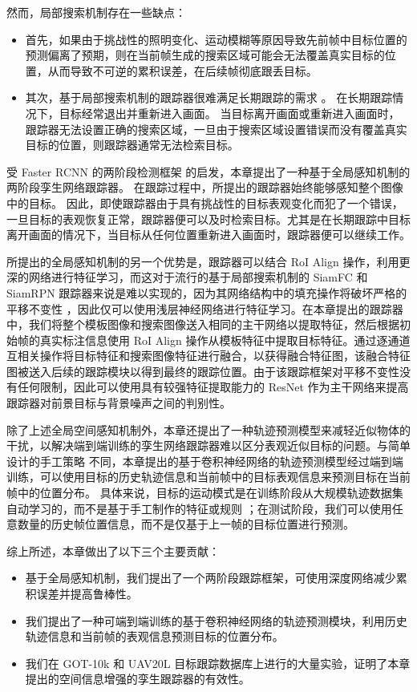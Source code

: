 然而，局部搜索机制存在一些缺点：

\begin{itemize}
\item 首先，如果由于挑战性的照明变化、运动模糊等原因导致先前帧中目标位置的预测偏离了预期，则在当前帧生成的搜索区域可能会无法覆盖真实目标的位置，从而导致不可逆的累积误差，在后续帧彻底跟丢目标。
\item 其次，基于局部搜索机制的跟踪器很难满足长期跟踪的需求 \cite{kalal2011tracking, hong2015multi}。
在长期跟踪情况下，目标经常退出并重新进入画面。
当目标离开画面或重新进入画面时，跟踪器无法设置正确的搜索区域，一旦由于搜索区域设置错误而没有覆盖真实目标的位置，则跟踪器通常无法检索目标。
\end{itemize}

受 Faster RCNN 的两阶段检测框架 \cite{ren2015faster} 的启发，本章提出了一种基于全局感知机制的两阶段孪生网络跟踪器。
在跟踪过程中，所提出的跟踪器始终能够感知整个图像中的目标。
因此，即使跟踪器由于具有挑战性的目标表观变化而犯了一个错误，一旦目标的表观恢复正常，跟踪器便可以及时检索目标。尤其是在长期跟踪中目标离开画面的情况下，当目标从任何位置重新进入画面时，跟踪器便可以继续工作。

所提出的全局感知机制的另一个优势是，跟踪器可以结合 RoI Align \cite{he2017mask} 操作，利用更深的网络进行特征学习，而这对于流行的基于局部搜索机制的 SiamFC \cite{SiamFC} 和 SiamRPN \cite{SiamRPN} 跟踪器来说是难以实现的，因为其网络结构中的填充操作将破坏严格的平移不变性 \cite{SiamRPN++}，因此仅可以使用浅层神经网络进行特征学习。在本章提出的跟踪器中，我们将整个模板图像和搜索图像送入相同的主干网络以提取特征，然后根据初始帧的真实标注信息使用 RoI Align 操作从模板特征中提取目标特征。通过逐通道互相关操作将目标特征和搜索图像特征进行融合，以获得融合特征图，该融合特征图被送入后续的跟踪模块以得到最终的跟踪位置。由于该跟踪框架对平移不变性没有任何限制，因此可以使用具有较强特征提取能力的 ResNet \cite{he2016deep} 作为主干网络来提高跟踪器对前景目标与背景噪声之间的判别性。

除了上述全局空间感知机制外，本章还提出了一种轨迹预测模型来减轻近似物体的干扰，以解决端到端训练的孪生网络跟踪器难以区分表观近似目标的问题。与简单设计的手工策略 \cite{SiamFC, SiamRPN} 不同，本章提出的基于卷积神经网络的轨迹预测模型经过端到端训练，可以使用目标的历史轨迹信息和当前帧中的目标表观信息来预测目标在当前帧中的位置分布。
具体来说，目标的运动模式是在训练阶段从大规模轨迹数据集自动学习的，而不是基于手工制作的特征或规则 \cite{iswanto2017visual}；在测试阶段，我们可以使用任意数量的历史帧位置信息，而不是仅基于上一帧的目标位置进行预测。

综上所述，本章做出了以下三个主要贡献：
\begin{itemize}
\item 基于全局感知机制，我们提出了一个两阶段跟踪框架，可使用深度网络减少累积误差并提高鲁棒性。
\item 我们提出了一种可端到端训练的基于卷积神经网络的轨迹预测模块，利用历史轨迹信息和当前帧的表观信息预测目标的位置分布。
\item 我们在 GOT-10k \cite{GOT-10k} 和 UAV20L \cite{mueller2016benchmark} 目标跟踪数据库上进行的大量实验，证明了本章提出的空间信息增强的孪生跟踪器的有效性。
\end{itemize}

